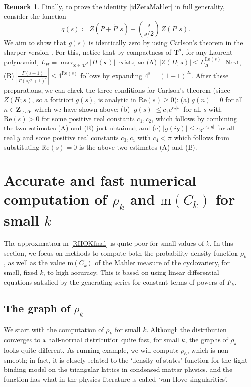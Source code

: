 \documentclass[12pt,reqno]{amsart}
\theoremstyle{definition}
\theoremstyle{plain}
\theoremstyle{definition}
\newtheorem{remark}[theorem]{Remark}
\newcommand{\Z}{\mathbf{Z}}
\newcommand{\T}{\mathbf{T}}
\newcommand\m{\mathrm{m}}
\renewcommand{\geq}{\geqslant}
\renewcommand{\leq}{\leqslant}
\renewcommand{\Re}{\mathrm{Re}}
\begin{document}
\begin{remark}
Finally, to prove the identity \eqref{idZetaMahler} in full generality, consider the function 
$$ g(s) \coloneqq  Z(P+\tilde P; s) - \binom{s}{s/2}\, Z(P;s). $$
We aim to show that $g(s)$ is identically zero by using Carlson's theorem in the sharper version \cite[\S 5.8]{Tit}. For this, notice that by compactness of $\T^d$, for any Laurent-polynomial, $L_H=\max_{\mathbf x \in \T^d} |H(\mathbf x)|$ exists, so (A) $|Z(H;s)| \leq L_H^{\Re(s)}$. Next, (B) $|\frac{\Gamma(s+1)}{\Gamma(s/2+1)^2} | \leq 4^{\Re(s)}$ follows by expanding $4^s = (1+1)^{2s}$. 
After these preparations, we can check the three conditions for Carlson's theorem (since $Z(H;s)$, so a fortriori $g(s)$, is analytic in $\Re(s) \geq 0$): 
(a) $g(n)=0$ for all $n \in \Z_{>0}$, which we have shown above; (b) $|g(s)|\leq c_1 e^{c_2|s|}$ for all $s$ with $\Re(s)>0$  for some positive real constants $c_1,c_2$, which follows by combining the two estimates (A) and (B) just obtained; and (c) $|g(iy)| \leq c_3 e^{c_4 |y|}$ for all real $y$ and some positive real constants $c_3,c_4$ with $c_4<\pi$ which follows from substituting $\Re(s)=0$ is the above two estimates (A) and (B).  
\end{remark} 


\section{Accurate and fast numerical computation of $\rho_k$ and $\m(C_k)$ for small $k$} 
\label{MC6} 

The approximation in \eqref{RHOKfinal} is quite poor for small values of $k$. In this section, we focus on methods to compute both the probability density function $\rho_k$, as well as the value $\m(C_k)$ of the Mahler measure of the cyclovariety, for small, fixed $k$, to high accuracy. This is based on using linear differential equations satisfied by the generating series for constant terms of powers of $F_k$.  

\subsection{The graph of $\rho_k$}
We start with the computation of $\rho_k$ for small $k$. Although the distribution converges to a half-normal distribution quite fast, for small $k$, the graphs of $\rho_k$ looks quite different. As running example, we will compute $\rho_6$, which is non-smooth; in fact, it is closely related to the `density of states' function for the tight binding model on the triangular lattice in condensed matter physics, and the function has what in the physics literature is called `van Hove singularities'. 
\end{document}
